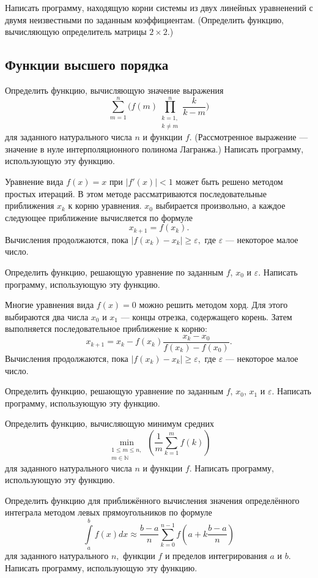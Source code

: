\task Написать программу, находящую корни системы из двух линейных
уравненений с двумя неизвестными по заданным
коэффициентам. (Определить функцию, вычисляющую определитель матрицы
$2\times 2.$)


\subsection{Функции высшего порядка}

\task Определить функцию, вычисляющую значение выражения
\[
\sum_{m=1}^n\bigg(
f(m)
\prod_{\substack{k=1,\\k\neq m}}^n
\frac{k}{k-m}
\bigg)
\]
для заданного натурального числа $n$ и функции $f.$ (Рассмотренное
выражение — значение в нуле интерполяционного полинома Лагранжа.)
Написать программу, использующую эту функцию.

\task Уравнение вида $f(x)=x$ при $|f'(x)|<1$ может быть решено
методом простых итераций. В этом методе рассматриваются
последовательные приближения $x_k$ к корню уравнения. $x_0$ выбирается
произвольно, а каждое следующее приближение вычисляется по формуле
\[
x_{k+1} = f(x_k).
\]
Вычисления продолжаются, пока $|f(x_k) - x_k| \geqslant \varepsilon,$
где $\varepsilon$ — некоторое малое число.

Определить функцию, решающую уравнение по заданным $f$, $x_0$ и
$\varepsilon.$ Написать программу, использующую эту функцию.

\task Многие уравнения вида $f(x)=0$ можно решить методом хорд. Для
этого выбираются два числа $x_0$ и $x_1$ — концы отрезка, содержащего
корень. Затем выполняется последовательное приближение к корню:
\[
x_{k+1} = x_k - f(x_k)\frac{x_k - x_0}{f(x_k) - f(x_0)}.
\] 
Вычисления продолжаются, пока $|f(x_k) - x_k| \geqslant \varepsilon,$
где $\varepsilon$ — некоторое малое число.

Определить функцию, решающую уравнение по заданным $f$, $x_0$, $x_1$ и
$\varepsilon.$ Написать программу, использующую эту функцию.

\task Определить функцию, вычисляющую минимум средних
\[
\min_{\substack{1\leqslant m\leqslant n,\\ m\in\mathbb{N}}}
\left(
\frac{1}{m}\sum_{k=1}^{m} f(k)
\right)
\]
для заданного натурального числа $n$ и функции $f.$ Написать
программу, использующую эту функцию.

\task Определить функцию для приближённого вычисления значения
определённого интеграла методом левых прямоугольников по формуле
\[
\int\limits_a^b f(x) dx \approx
\frac{b-a}{n}\sum_{k=0}^{n-1} f \left(a + k\frac{b-a}{n}\right)
\]
для заданного натурального $n,$ функции $f$ и пределов интегрирования
$a$ и $b.$ Написать программу, использующую эту функцию.

